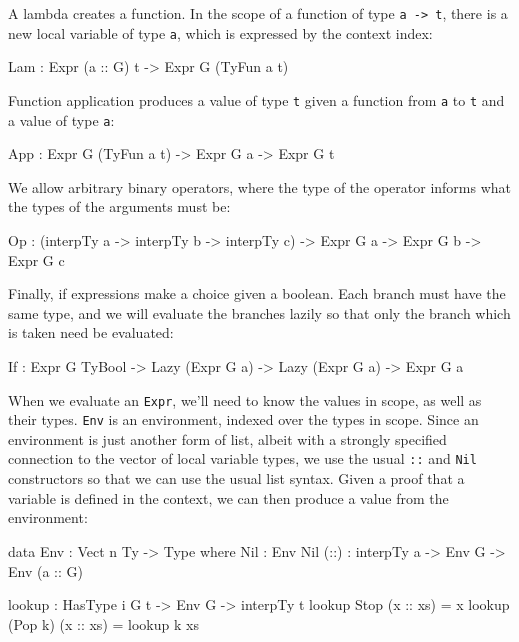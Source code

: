\noindent
A lambda creates a function.
In the scope of a function of type \texttt{a -> t}, there is a new local variable of type \texttt{a}, which is expressed by the context index:

\begin{code}
Lam : Expr (a :: G) t -> Expr G (TyFun a t)
\end{code}

\noindent
Function application produces a value of type \texttt{t} given a function from  \texttt{a} to \texttt{t} and a value of type \texttt{a}:

\begin{code}
App : Expr G (TyFun a t) -> Expr G a -> Expr G t
\end{code}

\noindent
We allow arbitrary binary operators, where the type of the operator informs what the types of the arguments must be:

\begin{code}
Op  : (interpTy a -> interpTy b -> interpTy c) -> Expr G a -> Expr G b -> 
      Expr G c
\end{code}

\noindent
Finally, if expressions make a choice given a boolean.
Each branch must have the same type, and we will evaluate the branches
lazily so that only the branch which is taken need be evaluated:

\begin{code}
If  : Expr G TyBool -> Lazy (Expr G a) -> Lazy (Expr G a) -> Expr G a
\end{code}

\noindent
When we evaluate an \texttt{Expr}, we'll need to know the values in scope, as well as their types.
\texttt{Env} is an environment, indexed over the types in scope.
Since an environment is just another form of list, albeit with a strongly specified connection to the vector of local variable types, we use the usual \texttt{::} and \texttt{Nil} constructors so that we can use the usual list syntax.
Given a proof that a variable is defined in the context, we can then produce a value from the environment:

\begin{code}
data Env : Vect n Ty -> Type where
    Nil  : Env Nil
    (::) : interpTy a -> Env G -> Env (a :: G)

lookup : HasType i G t -> Env G -> interpTy t
lookup Stop    (x :: xs) = x
lookup (Pop k) (x :: xs) = lookup k xs
\end{code}

